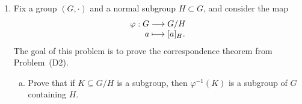 \documentclass{article}
\newcommand{\bracks}[1]{\left\{#1\right\}}
\begin{document}
\begin{enumerate}[(H1)]
\begin{enumerate}[(a)]
\item 
Prove or disprove:\ $G/C$ has trivial center.  

\begin{proof}[Disproof]
This is not true in general. Consider the dihedral group $D_4$;
The center of $D_4$, which is we'll denote $C$, is $\bracks{e,\ r^2}
$. The quotient of $D_4$ with its center is
$$D_4/C = \bracks{[e]_C,\ [r]_C,\ [f]_C,\ [rf]_C}$$
This quotient group is isomorphic to $D_2$, and to show that we'll 
use the FIT.\\\\
Let $\varphi: D_4 \to D_2$ be a homomorphism defined as
\begin{gather*}
r \mapsto r\\
f \mapsto f
\end{gather*}
$\varphi$ is surjective because every element of $D_2$ can obtained
from an element of $D_4$ under $\varphi$, and we have that 
$\ker(\varphi) = \bracks{e, r^2} = C$. So by the FIT, 
$D_4/C \cong D_2$.\\\\ 
As $D_2$ is abelian, $D_4/C$ must be abelian,
as well. This means that the center of $D_4/C$ cannot be trivial,
because every element of $D_4/C$ commutes with every other element.

\end{proof}

\end{enumerate}

\item 
Fix a group $(G, \cdot)$ and a normal subgroup $H \subset G$, and 
consider the map 
$$\begin{array}{r@{}c@{}l}
\varphi:G &{}\longrightarrow{}& G/H \\
a &{}\longmapsto{}& [a]_H.
\end{array}$$
The goal of this problem is to prove the correspondence theorem from 
Problem~(D2).  

\begin{enumerate}[(a)]
\item 
Prove that if $K \subseteq G/H$ is a subgroup, then $\varphi^{-1}(K)$ 
is a subgroup of $G$ containing $H$.


\end{enumerate}
\end{enumerate}
\end{document}
